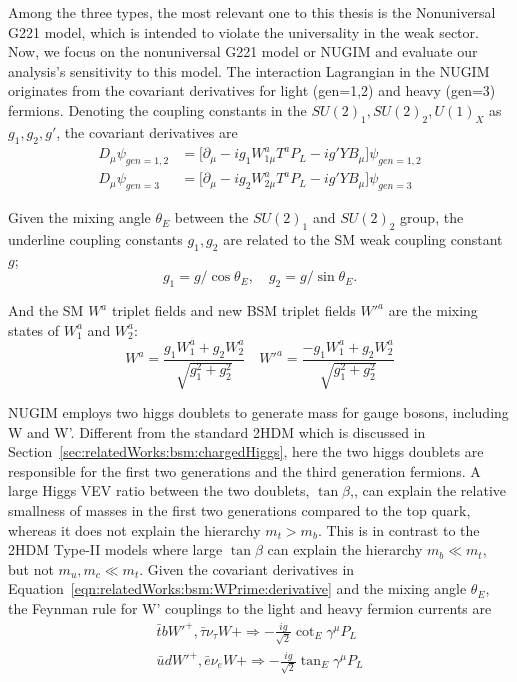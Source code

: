 Among the three types, the most relevant one to this thesis is the Nonuniversal G221 model, which is intended to violate the universality in the weak sector. Now, we focus on the nonuniversal G221 model or NUGIM and evaluate our analysis's sensitivity to this model. The interaction Lagrangian in the NUGIM originates from the covariant derivatives for light (gen=1,2) and heavy (gen=3) fermions. Denoting the coupling constants in the $SU(2)_1 , SU(2)_2, U(1)_X$ as $g_1, g_2, g'$, the covariant derivatives are
\begin{equation}
\begin{split}
	D_\mu \psi_{gen=1,2} &= \big[ \partial_\mu -ig_1W^a_{1\mu} T^a P_L - ig'YB_\mu\big] \psi_{gen=1,2}  \\
    D_\mu \psi_{gen=3} &= \big[ \partial_\mu -ig_2W^a_{2\mu} T^a P_L - ig'YB_\mu\big] \psi_{gen=3} 
\end{split}
\label{eqn:relatedWorks:bsm:WPrime:derivative}
\end{equation}

\noindent Given the mixing angle $\theta_E$ between the $SU(2)_1$ and $SU(2)_2$ group, the underline coupling constants $g_1, g_2$ are related to the SM weak coupling constant $g$;
\begin{equation}
	g_1=g/ \cos \theta_E, \quad g_2=g/ \sin \theta_E.
\end{equation}

\noindent And the SM $W^a$ triplet fields and new BSM triplet fields $W'^a$  are the mixing states of $W_1^a$ and $W_2^a$:
\begin{equation}
	W^a = \frac{g_1 W^a_1 + g_2 W_2^a}{\sqrt{g_1^2+g_2^2}} \quad W'^a = \frac{-g_1 W^a_1 + g_2 W_2^a}{\sqrt{g_1^2+g_2^2}}
\end{equation}

\noindent NUGIM employs two higgs doublets to generate mass for gauge bosons, including W and W'. Different from the standard 2HDM which is discussed in Section~\ref{sec:relatedWorks:bsm:chargedHiggs}, here the two higgs doublets are responsible for the first two generations and the third generation fermions. A large Higgs VEV ratio between the two doublets, $\tan \beta$,, can explain the relative smallness of masses in the first two generations compared to the top quark, whereas it does not explain the hierarchy $m_t > m_b$. This is in contrast to the 2HDM Type-II models where large $\tan \beta$ can explain the hierarchy $m_b\ll m_t$, but not $m_u, m_c  \ll m_t$. Given the covariant derivatives in Equation~\ref{eqn:relatedWorks:bsm:WPrime:derivative} and the mixing angle $\theta_E$, the Feynman rule for W'  \cite{Edelhauser:2014yra} couplings to the light and heavy fermion currents are 
\begin{equation}
\begin{split}
	\bar{t} b W'^+ , \bar{\tau} \nu_\tau W+ \Longrightarrow -\frac{i g}{\sqrt{2}} \cot_E \gamma^\mu P_L \\
    \bar{u} d W'^+ , \bar{e} \nu_e W+ \Longrightarrow -\frac{i g}{\sqrt{2}} \tan_E \gamma^\mu P_L
\end{split}
\label{eqn:relatedWorks:bsm:WPrime:feynmanRule}
\end{equation}

